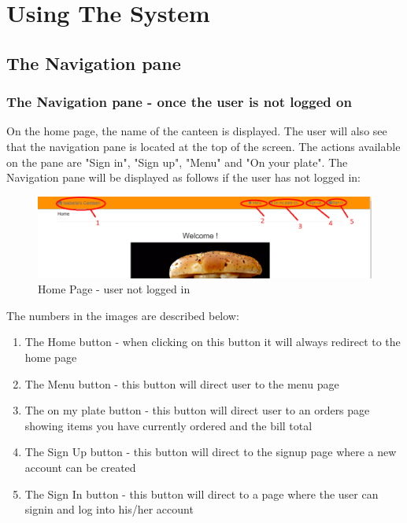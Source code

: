 \documentclass[a4paper,12pt]{article}
\begin{document}
\section{Using The System} 

\subsection{The Navigation pane} 

\subsubsection{The Navigation pane - once the user is not  logged on}
On the home page, the name of the canteen is displayed. The user will also see that the navigation pane is located at the top of the screen. The actions available on the pane are "Sign in", "Sign up", "Menu" and "On your plate". 
The Navigation pane will be displayed as follows if the user has not logged in:

\begin{figure}[H]
  \centering
    \includegraphics[width=1.0\textwidth]{screenshots/HomePage.png}
    \caption{Home Page - user not logged in } 
\end{figure}

The numbers in the images are described below:

\begin{enumerate}
\item The Home button - when clicking on this button it will always redirect to the home page
\item The Menu button - this button will direct user to the menu page
\item The on my plate button - this button will direct user to an orders page showing items you have currently ordered and the bill total
\item The Sign Up button - this button will direct to the signup page where a new account can be created
\item The Sign In button - this button will direct to a page where the user can signin and log into his/her account
\end{enumerate}
\end{document}
